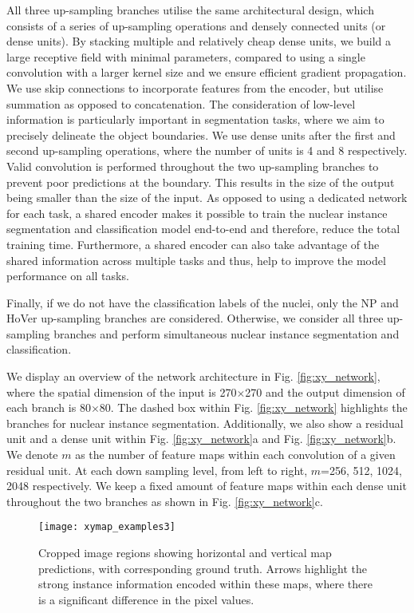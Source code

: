 \documentclass[journal]{IEEEtran}
\begin{document}
    All three up-sampling branches utilise the same architectural design, which consists of a series of up-sampling operations and densely connected units \cite{densenet} (or dense units). By stacking multiple and relatively cheap dense units, we build a large receptive field with minimal parameters, compared to using a single convolution with a larger kernel size and we ensure efficient gradient propagation. We use skip connections \cite{ronneberger2015u} to incorporate features from the encoder, but utilise summation as opposed to concatenation. The consideration of low-level information is particularly important in segmentation tasks, where we aim to precisely delineate the object boundaries. We use dense units after the first and second up-sampling operations, where the number of units is 4 and 8 respectively. Valid convolution is performed throughout the two up-sampling branches to prevent poor predictions at the boundary. This results in the size of the output being smaller than the size of the input. As opposed to using a dedicated network for each task, a shared encoder makes it possible to train the nuclear instance segmentation and classification model end-to-end and therefore, reduce the total training time. Furthermore, a shared encoder can also take advantage of the shared information across multiple tasks and thus, help to improve the model performance on all tasks. 
    
    Finally, if we do not have the classification labels of the nuclei, only the NP and HoVer up-sampling branches are considered. Otherwise, we consider all three up-sampling branches and perform simultaneous nuclear instance segmentation and classification. 
    
    We display an overview of the network architecture in Fig. \ref{fig:xy_network}, where the spatial dimension of the input is 270$\times$270 and the output dimension of each branch is 80$\times$80. The dashed box within Fig. \ref{fig:xy_network} highlights the branches for nuclear instance segmentation. Additionally, we also show a residual unit and a dense unit within Fig. \ref{fig:xy_network}a and Fig. \ref{fig:xy_network}b. We denote $m$ as the number of feature maps within each convolution of a given residual unit. At each down sampling level, from left to right, $m$=256, 512, 1024, 2048 respectively. We keep a fixed amount of feature maps within each dense unit throughout the two branches as shown in Fig. \ref{fig:xy_network}c.

		\begin{figure*}[!t]
		\centering
		\texttt{[image: xymap\_examples3]}
		\caption{Cropped image regions showing horizontal and vertical map predictions, with corresponding ground truth. Arrows highlight the strong instance information encoded within these maps, where there is a significant difference in the pixel values.}
		\label{fig:xy_output}
	\end{figure*}
	
\end{document}
